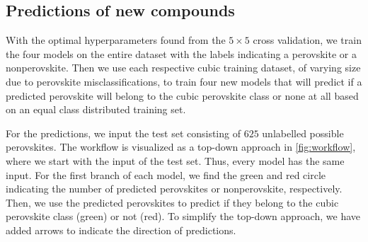 \begin{table}[!ht]
\centering
\caption{Table with corresponding best estimators during a grid search scheme for predicting cubic perovskites or only perovskites. The test score is here referred to as the mean balanced accuracy score of the models with the same parameters in the cross validation, and we list all standard deviations in paranthesis.}
\label{tab:cubic-optimal}
\noindent{}
\end{table}


\subsection{Predictions of new compounds}

With the optimal hyperparameters found from the $5\times5$ cross validation, we train the four models on the entire dataset with the labels indicating a perovskite or a nonperovskite. Then we use each respective cubic training dataset, of varying size due to perovskite misclassifications, to train four new models that will predict if a predicted perovskite will belong to the cubic perovskite class or none at all based on an equal class distributed training set.



For the predictions, we input the test set consisting of $625$ unlabelled possible perovskites. The workflow is visualized as a top-down approach in \autoref{fig:workflow}, where we start with the input of the test set. Thus, every model has the same input. For the first branch of each model, we find the green and red circle indicating the number of predicted perovskites or nonperovskite, respectively. Then, we use the predicted perovskites to predict if they belong to the cubic perovskite class (green) or not (red). To simplify the top-down approach, we have added arrows to indicate the direction of predictions.

